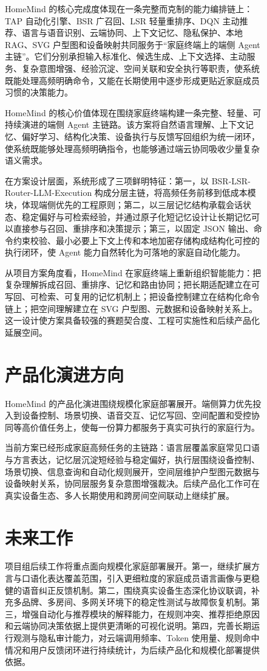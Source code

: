 \documentclass[12pt,a4paper,oneside]{ctexrep}
\begin{document}
\begin{figure}[H]
HomeMind 的核心完成度体现在一条完整而克制的能力编排链上：TAP 自动化引擎、BSR 广召回、LSR 轻量重排序、DQN 主动推荐、语言与语音识别、云端协同、上下文记忆、隐私保护、本地 RAG、SVG 户型图和设备映射共同服务于“家庭终端上的端侧 Agent 主链”。它们分别承担输入标准化、候选生成、上下文选择、主动服务、复杂意图增强、经验沉淀、空间关联和安全执行等职责，使系统既能处理高频明确命令，又能在长期使用中逐步形成更贴近家庭成员习惯的决策能力。

HomeMind 的核心价值体现在围绕家庭终端构建一条完整、轻量、可持续演进的端侧 Agent 主链路。该方案将自然语言理解、上下文记忆、偏好学习、结构化决策、设备执行与反馈写回组织为统一闭环，使系统既能够处理高频明确指令，也能够通过端云协同吸收少量复杂语义需求。

在方案设计层面，系统形成了三项鲜明特征：第一，以 BSR-LSR-Router-LLM-Execution 构成分层主链，将高频任务前移到低成本模块，体现端侧优先的工程原则；第二，以三层记忆结构承载会话状态、稳定偏好与可检索经验，并通过原子化短记忆设计让长期记忆可以直接参与召回、重排序和决策提示；第三，以固定 JSON 输出、命令约束校验、最小必要上下文上传和本地加密存储构成结构化可控的执行闭环，使 Agent 能力自然转化为可落地的家庭自动化能力。

从项目方案角度看，HomeMind 在家庭终端上重新组织智能能力：把复杂理解拆成召回、重排序、记忆和路由协同；把长期适配建立在可写回、可检索、可复用的记忆机制上；把设备控制建立在结构化命令链上；把空间理解建立在 SVG 户型图、元数据和设备映射关系上。这一设计使方案具备较强的赛题契合度、工程可实施性和后续产品化延展空间。


\section{产品化演进方向}

HomeMind 的产品化演进围绕规模化家庭部署展开。端侧算力优先投入到设备控制、场景切换、语音交互、记忆写回、空间配置和受控协同等高价值任务上，使每一份算力都服务于真实可执行的家庭行为。

当前方案已经形成家庭高频任务的主链路：语言层覆盖家庭常见口语与方言表达，记忆层沉淀短经验与稳定偏好，执行层围绕设备控制、场景切换、信息查询和自动化规则展开，空间层维护户型图元数据与设备映射关系，协同层服务复杂意图增强裁决。后续产品化工作可在真实设备生态、多人长期使用和跨房间空间联动上继续扩展。


\section{未来工作}

项目组后续工作将重点面向规模化家庭部署展开。第一，继续扩展方言与口语化表达覆盖范围，引入更细粒度的家庭成员语言画像与更稳健的语音纠正反馈机制。第二，围绕真实设备生态深化协议联调，补充多品牌、多房间、多网关环境下的稳定性测试与故障恢复机制。第三，增强自动化与推荐模块的解释能力，在规则冲突、推荐拒绝原因和云端协同决策依据上提供更清晰的可视化说明。第四，完善长期运行观测与隐私审计能力，对云端调用频率、Token 使用量、规则命中情况和用户反馈闭环进行持续统计，为后续产品化和规模化部署提供依据。


\end{figure}
\end{document}
